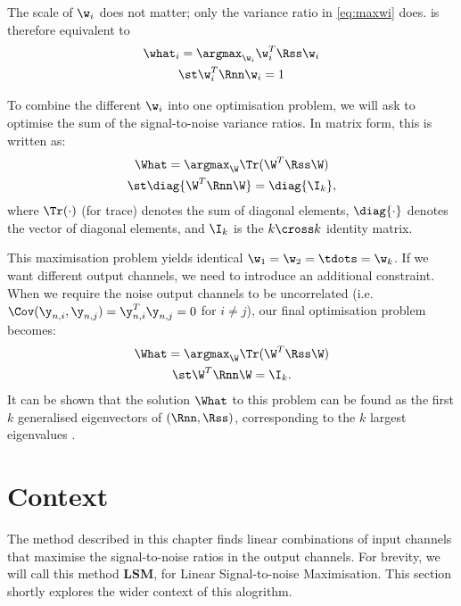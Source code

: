The scale of $\w_i$ does not matter; only the variance ratio in
\cref{eq:maxwi} does.  is therefore equivalent to
%
\begin{gather*}
\what_i = \argmax_{\w_i} \w_i^T \Rss \w_i \\
\st \w_i^T \Rnn \w_i = 1
\end{gather*}

To combine the different $\w_i$ into one optimisation problem, we will ask to
optimise the sum of the signal-to-noise variance ratios. In matrix form, this
is written as:
\begin{gather*}
\What = \argmax_{\W} \Tr(\W^T \Rss \W) \\
\st \diag{\W^T \Rnn \W} = \diag{\I_k},
\end{gather*}
%
where $\Tr(\cdot)$ (for trace) denotes the sum of diagonal elements,
$\diag{\cdot}$ denotes the vector of diagonal elements, and $\I_k$ is the $k
\cross k$ identity matrix.

This maximisation problem yields identical $\w_1 = \w_2 = \tdots = \w_k$. If
we want different output channels, we need to introduce an additional
constraint. When we require the noise output channels to be uncorrelated
(i.e. $\Cov(\y_{n,i}, \y_{n,j}) = \y_{n,i}^T \y_{n,j} = 0$ for $i \neq j$),
our final optimisation problem becomes:
%
\begin{gather}
\What = \argmax_{\W} \Tr(\W^T \Rss \W)  \label{eq:opti_What} \\
\st \W^T \Rnn \W = \I_k.  \nonumber
\end{gather}
%
It can be shown that the solution $\What$ to this problem can be found as the
first $k$ generalised eigenvectors of $(\Rnn,\Rss)$, corresponding to the $k$
largest eigenvalues \cite{Kokiopoulou2011}.





\section{Context}

The method described in this chapter finds linear combinations of input
channels that maximise the signal-to-noise ratios in the output channels. For
brevity, we will call this method \textbf{LSM}, for Linear Signal-to-noise
Maximisation.\footnotemark{} This section shortly explores the wider context
of this alogrithm.




